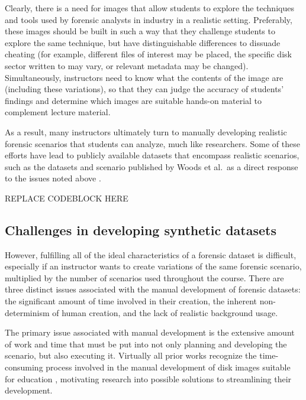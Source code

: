 \documentclass[letterpaper,12pt]{report}
\begin{document}
Clearly, there is a need for images that allow students to explore the
techniques and tools used by forensic analysts in industry in a
realistic setting. Preferably, these images should be built in such a
way that they challenge students to explore the same technique, but have
distinguishable differences to dissuade cheating (for example, different
files of interest may be placed, the specific disk sector written to may
vary, or relevant metadata may be changed). Simultaneously, instructors
need to know what the contents of the image are (including these
variations), so that they can judge the accuracy of students' findings
and determine which images are suitable hands-on material to complement
lecture material.

As a result, many instructors ultimately turn to manually developing
realistic forensic scenarios that students can analyze, much like
researchers. Some of these efforts have lead to publicly available
datasets that encompass realistic scenarios, such as the datasets and
scenario published by Woods et al.~as a direct response to the issues
noted above \cite{woodsCreatingRealisticCorpora2011}.

REPLACE CODEBLOCK HERE

\subsection{Challenges in developing synthetic
datasets}\label{challenges-in-developing-synthetic-datasets}

However, fulfilling all of the ideal characteristics of a forensic
dataset is difficult, especially if an instructor wants to create
variations of the same forensic scenario, multiplied by the number of
scenarios used throughout the course. There are three distinct issues
associated with the manual development of forensic datasets: the
significant amount of time involved in their creation, the inherent
non-determinism of human creation, and the lack of realistic background
usage.

The primary issue associated with manual development is the extensive
amount of work and time that must be put into not only planning and
developing the scenario, but also executing it. Virtually all prior
works recognize the time-consuming process involved in the manual
development of disk images suitable for education
\cite{adelsteinAutomaticallyCreatingRealistic2005,gobelForTraceHolisticForensic2022,guptaDigitalForensicsLab2022,mochForensicImageGenerator2009,russellForensicImageDescription2012,scanlonEviPlantEfficientDigital2017,woodsCreatingRealisticCorpora2011},
motivating research into possible solutions to streamlining their
development.
\end{document}
